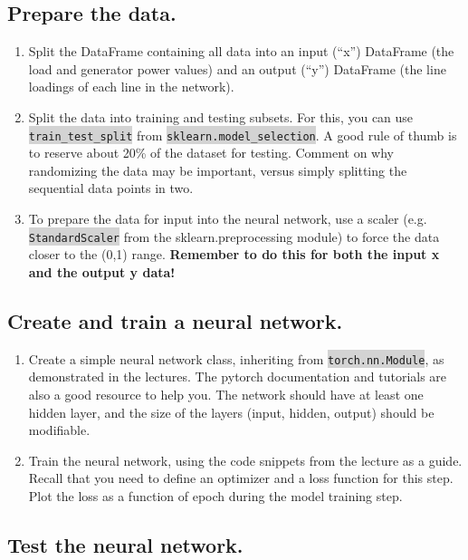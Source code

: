 \documentclass[11pt]{article}
\newcommand{\code}[1]{\colorbox{lightgray}{\texttt{#1}}}
\begin{document}
\subsection{Prepare the data.}

\begin{enumerate}
\item Split the DataFrame containing all data into an input (``x'') DataFrame (the load and generator
  power values) and an output (``y'') DataFrame (the line loadings of each line in the network).
\item Split the data into training and testing subsets. For this, you can use \code{train\_test\_split} from \code{sklearn.model\_selection}.
  A good rule of thumb is to reserve about 20\% of the dataset for testing. Comment on why randomizing the data may be important, versus simply
  splitting the sequential data points in two.
\item To prepare the data for input into the neural network, use a scaler
  (e.g. \code{StandardScaler} from the sklearn.preprocessing module) to force the data closer to
  the (0,1) range. \textbf{Remember to do this for both the input x and the output y data!}
\end{enumerate}

\subsection{Create and train a neural network.}

\begin{enumerate}
\item Create a simple neural network class, inheriting from \code{torch.nn.Module},
  as demonstrated in the lectures. The pytorch documentation and tutorials are also
  a good resource to help you.
  The network should have at least one hidden layer, and the
  size of the layers (input, hidden, output) should be modifiable.
\item Train the neural network, using the code snippets from the lecture as a guide. Recall
  that you need to define an optimizer and a loss function for this step. Plot the loss
  as a function of epoch during the model training step.
\end{enumerate}

\subsection{Test the neural network.}
\end{document}
